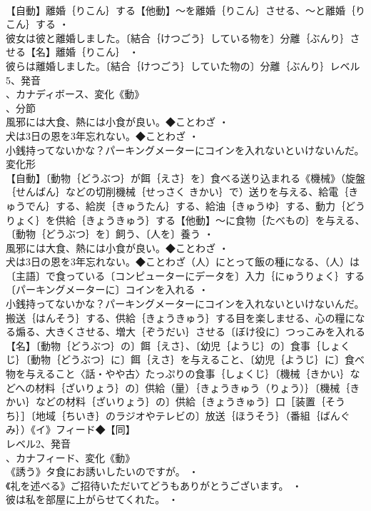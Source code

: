 \documentclass[8pt]{extreport}
\begin{document}
\begin{CJK}{UTF8}{min}
\\	【自動】離婚｛りこん｝する【他動】～を離婚｛りこん｝させる、～と離婚｛りこん｝する ・
\\	彼女は彼と離婚しました。〔結合｛けつごう｝している物を〕分離｛ぶんり｝させる【名】離婚｛りこん｝ ・
\\	彼らは離婚しました。〔結合｛けつごう｝していた物の〕分離｛ぶんり｝レベル5、発音
\\	、カナディボース、変化《動》
\\	、分節
\\	風邪には大食、熱には小食が良い。◆ことわざ ・
\\	犬は3日の恩を3年忘れない。◆ことわざ ・
\\	小銭持ってないかな？パーキングメーターにコインを入れないといけないんだ。	変化形 
\\	【自動】〔動物｛どうぶつ｝が餌｛えさ｝を〕食べる送り込まれる《機械》（旋盤｛せんばん｝などの切削機械｛せっさく きかい｝で）送りを与える、給電｛きゅうでん｝する、給炭｛きゅうたん｝する、給油｛きゅうゆ｝する、動力｛どうりょく｝を供給｛きょうきゅう｝する【他動】～に食物｛たべもの｝を与える、〔動物｛どうぶつ｝を〕飼う、〔人を〕養う ・
\\	風邪には大食、熱には小食が良い。◆ことわざ ・
\\	犬は3日の恩を3年忘れない。◆ことわざ（人）にとって飯の種になる、（人）は〔主語〕で食っている〔コンピューターにデータを〕入力｛にゅうりょく｝する〔パーキングメーターに〕コインを入れる ・
\\	小銭持ってないかな？パーキングメーターにコインを入れないといけないんだ。搬送｛はんそう｝する、供給｛きょうきゅう｝する目を楽しませる、心の糧になる煽る、大きくさせる、増大｛ぞうだい｝させる〔ぼけ役に〕つっこみを入れる【名】〔動物｛どうぶつ｝の〕餌｛えさ｝、〔幼児｛ようじ｝の〕食事｛しょくじ｝〔動物｛どうぶつ｝に〕餌｛えさ｝を与えること、〔幼児｛ようじ｝に〕食べ物を与えること〈話・やや古〉たっぷりの食事｛しょくじ｝〔機械｛きかい｝などへの材料｛ざいりょう｝の〕供給（量）｛きょうきゅう（りょう）｝〔機械｛きかい｝などの材料｛ざいりょう｝の〕供給｛きょうきゅう｝口［装置｛そうち｝］〔地域｛ちいき｝のラジオやテレビの〕放送｛ほうそう｝（番組｛ばんぐみ｝）《イ》フィード◆【同】
\\	レベル2、発音
\\	、カナフィード、変化《動》
\\	《誘う》タ食にお誘いしたいのですが。 ・
\\	《礼を述べる》ご招待いただいてどうもありがとうございます。 ・
\\	彼は私を部屋に上がらせてくれた。 ・

\end{CJK}
\end{document}
